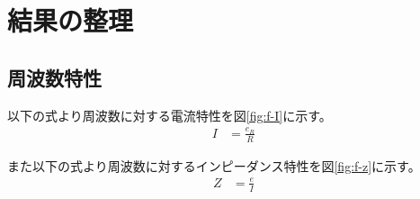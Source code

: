 \documentclass[11pt,a4paper,fleqn]{jsarticle}
\begin{document}
\section{結果の整理}
\subsection{周波数特性}
以下の式より周波数に対する電流特性を図\ref{fig:f-I}に示す。
\begin{align}
I&=\frac{e_{R}}{R}
\end{align}

\begin{figure}[!h]
\end{figure}

また以下の式より周波数に対するインピーダンス特性を図\ref{fig:f-z}に示す。
\begin{align}
Z&=\frac{e}{I}\\
\end{align}

\begin{figure}[H]
\end{figure}
\end{document}
